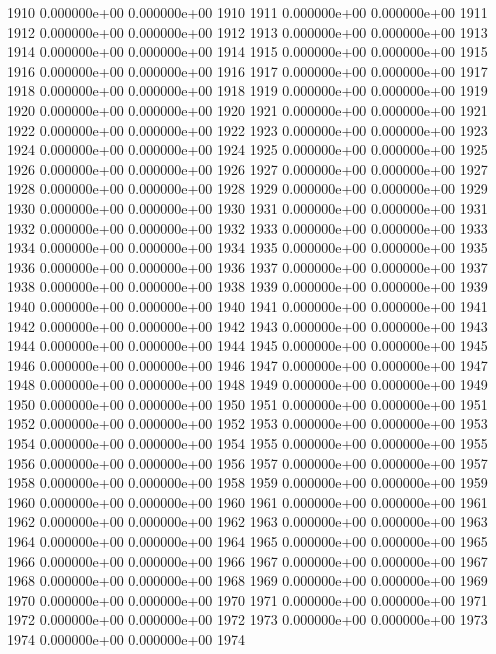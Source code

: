 \documentclass{article}
\begin{document}
\begin{Schunk}
\begin{Soutput}
1910   0.000000e+00   0.000000e+00 1910
1911   0.000000e+00   0.000000e+00 1911
1912   0.000000e+00   0.000000e+00 1912
1913   0.000000e+00   0.000000e+00 1913
1914   0.000000e+00   0.000000e+00 1914
1915   0.000000e+00   0.000000e+00 1915
1916   0.000000e+00   0.000000e+00 1916
1917   0.000000e+00   0.000000e+00 1917
1918   0.000000e+00   0.000000e+00 1918
1919   0.000000e+00   0.000000e+00 1919
1920   0.000000e+00   0.000000e+00 1920
1921   0.000000e+00   0.000000e+00 1921
1922   0.000000e+00   0.000000e+00 1922
1923   0.000000e+00   0.000000e+00 1923
1924   0.000000e+00   0.000000e+00 1924
1925   0.000000e+00   0.000000e+00 1925
1926   0.000000e+00   0.000000e+00 1926
1927   0.000000e+00   0.000000e+00 1927
1928   0.000000e+00   0.000000e+00 1928
1929   0.000000e+00   0.000000e+00 1929
1930   0.000000e+00   0.000000e+00 1930
1931   0.000000e+00   0.000000e+00 1931
1932   0.000000e+00   0.000000e+00 1932
1933   0.000000e+00   0.000000e+00 1933
1934   0.000000e+00   0.000000e+00 1934
1935   0.000000e+00   0.000000e+00 1935
1936   0.000000e+00   0.000000e+00 1936
1937   0.000000e+00   0.000000e+00 1937
1938   0.000000e+00   0.000000e+00 1938
1939   0.000000e+00   0.000000e+00 1939
1940   0.000000e+00   0.000000e+00 1940
1941   0.000000e+00   0.000000e+00 1941
1942   0.000000e+00   0.000000e+00 1942
1943   0.000000e+00   0.000000e+00 1943
1944   0.000000e+00   0.000000e+00 1944
1945   0.000000e+00   0.000000e+00 1945
1946   0.000000e+00   0.000000e+00 1946
1947   0.000000e+00   0.000000e+00 1947
1948   0.000000e+00   0.000000e+00 1948
1949   0.000000e+00   0.000000e+00 1949
1950   0.000000e+00   0.000000e+00 1950
1951   0.000000e+00   0.000000e+00 1951
1952   0.000000e+00   0.000000e+00 1952
1953   0.000000e+00   0.000000e+00 1953
1954   0.000000e+00   0.000000e+00 1954
1955   0.000000e+00   0.000000e+00 1955
1956   0.000000e+00   0.000000e+00 1956
1957   0.000000e+00   0.000000e+00 1957
1958   0.000000e+00   0.000000e+00 1958
1959   0.000000e+00   0.000000e+00 1959
1960   0.000000e+00   0.000000e+00 1960
1961   0.000000e+00   0.000000e+00 1961
1962   0.000000e+00   0.000000e+00 1962
1963   0.000000e+00   0.000000e+00 1963
1964   0.000000e+00   0.000000e+00 1964
1965   0.000000e+00   0.000000e+00 1965
1966   0.000000e+00   0.000000e+00 1966
1967   0.000000e+00   0.000000e+00 1967
1968   0.000000e+00   0.000000e+00 1968
1969   0.000000e+00   0.000000e+00 1969
1970   0.000000e+00   0.000000e+00 1970
1971   0.000000e+00   0.000000e+00 1971
1972   0.000000e+00   0.000000e+00 1972
1973   0.000000e+00   0.000000e+00 1973
1974   0.000000e+00   0.000000e+00 1974

\end{Soutput}
\end{Schunk}
\end{document}
